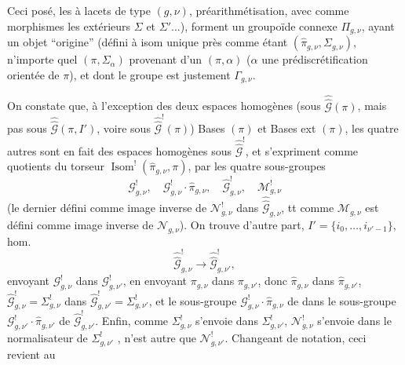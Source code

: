 Ceci posé, les 
  à lacets de type $(g,\nu)$,
 préarithmétisation,
avec comme morphismes les   extérieurs
 $\Sigma$ et $\Sigma'\ldots$),
forment un groupoïde connexe $\Pi_{g,\nu}$, ayant un objet ``origine''
(défini à isom unique près comme étant $(\widehat{\pi}_{g,\nu},\Sigma_{g,\nu})$,
 n'importe quel $(\pi,\Sigma_{\alpha})$ provenant d'un
$(\pi,\alpha)$ ($\alpha$ une prédiscrétification orientée de $\pi$),
et dont le groupe   est justement $\Gamma_{g,\nu}$.

On constate que, à l'exception des deux espaces homogènes
(sous $\widehat{\widehat{\mathcal G}}(\pi)$, mais pas  sous
$\widehat{\widehat{\mathcal G}}(\pi,I')$, voire sous
$\widehat{\widehat{\mathcal G}}^{!}(\pi)$) Bases $(\pi)$ et Bases ext $(\pi)$,
les quatre autres sont en fait des espaces homogènes sous
$\widehat{\widehat{\mathcal G}}^{!}$, et s'expriment comme quotients du
torseur
$\operatorname{Isom}^{!}(\widehat{\pi}_{g,\nu},\pi)$, par les quatre sous-groupes
\[
\mathcal G^{!}_{g,\nu},\quad
\mathcal G^{!}_{g,\nu}\cdot\widehat{\pi}_{g,\nu},\quad
\widehat{\mathcal G}^{!}_{g,\nu},\quad
\mathcal M^{!}_{g,\nu}
\]
(le dernier défini comme image inverse de $\mathcal N^{!}_{g,\nu}$ dans
$\widehat{\widehat{\mathcal G}}_{g,\nu}$, tt comme $\mathcal M_{g,\nu}$ est défini
comme image inverse de $\mathcal N_{g,\nu}$).
On trouve d'autre part,  $I'=\{i_0,\ldots,i_{\nu'-1}\}$,
 hom.
\[
\widehat{\widehat{\mathcal G}}^{!}_{g,\nu}\longrightarrow
\widehat{\widehat{\mathcal G}}^{!}_{g,\nu'},
\]
envoyant $\mathcal G^{!}_{g,\nu}$ dans $\mathcal G^{!}_{g,\nu'}$,
en envoyant $\pi_{g,\nu}$ dans $\pi_{g,\nu'}$, donc $\widehat{\pi}_{g,\nu}$
dans $\widehat{\pi}_{g,\nu'}$,
$\widehat{\mathcal G}^{!}_{g,\nu}=\Sigma^{!}_{g,\nu}$ dans
$\widehat{\mathcal G}^{!}_{g,\nu'}=\Sigma^{!}_{g,\nu'}$, et le sous-groupe
$\mathcal G^{!}_{g,\nu}\cdot\widehat{\pi}_{g,\nu}$ de
 
dans le sous-groupe $\mathcal G^{!}_{g,\nu'}\cdot\widehat{\pi}_{g,\nu'}$ de
$\widehat{\mathcal G}^{!}_{g,\nu'}$.
Enfin, comme $\Sigma^{!}_{g,\nu}$ s'envoie dans $\Sigma^{!}_{g,\nu'}$,
 $\mathcal N^{!}_{g,\nu}$ s'envoie dans le normalisateur
de $\Sigma^{!}_{g,\nu'}$ ,
 n'est autre que $\mathcal N^{!}_{g,\nu'}$.
Changeant de notation, ceci revient au

